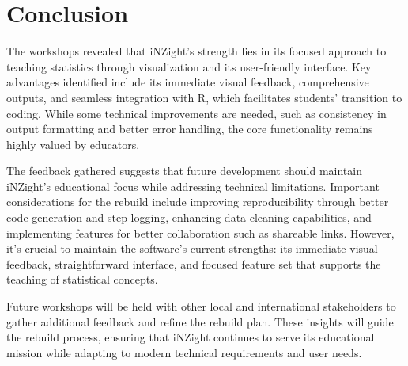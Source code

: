 \documentclass{article}
\begin{document}
\section{Conclusion}

The workshops revealed that iNZight's strength lies in its focused approach to teaching statistics through visualization and its user-friendly interface.
Key advantages identified include its immediate visual feedback, comprehensive outputs, and seamless integration with R, which facilitates students' transition to coding.
While some technical improvements are needed, such as consistency in output formatting and better error handling, the core functionality remains highly valued by educators.

The feedback gathered suggests that future development should maintain iNZight's educational focus while addressing technical limitations.
Important considerations for the rebuild include improving reproducibility through better code generation and step logging, enhancing data cleaning capabilities, and implementing features for better collaboration such as shareable links.
However, it's crucial to maintain the software's current strengths: its immediate visual feedback, straightforward interface, and focused feature set that supports the teaching of statistical concepts.

Future workshops will be held with other local and international stakeholders to gather additional feedback and refine the rebuild plan.
These insights will guide the rebuild process, ensuring that iNZight continues to serve its educational mission while adapting to modern technical requirements and user needs.

\printbibliography
\end{document}

